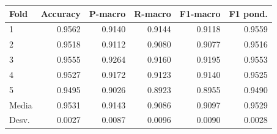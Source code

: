 \begin{tabular}{lrrrrr}
\toprule
\textbf{Fold} & \textbf{Accuracy} & \textbf{P-macro} & \textbf{R-macro} & \textbf{F1-macro} & \textbf{F1 pond.} \\
\midrule
1 & 0.9562 & 0.9140 & 0.9144 & 0.9118 & 0.9559 \\
2 & 0.9518 & 0.9112 & 0.9080 & 0.9077 & 0.9516 \\
3 & 0.9555 & 0.9264 & 0.9160 & 0.9195 & 0.9553 \\
4 & 0.9527 & 0.9172 & 0.9123 & 0.9140 & 0.9525 \\
5 & 0.9495 & 0.9026 & 0.8923 & 0.8955 & 0.9490 \\
Media & 0.9531 & 0.9143 & 0.9086 & 0.9097 & 0.9529 \\
Desv. & 0.0027 & 0.0087 & 0.0096 & 0.0090 & 0.0028 \\
\bottomrule
\end{tabular}
